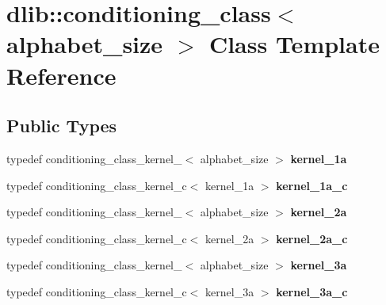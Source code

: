 \hypertarget{classdlib_1_1conditioning__class}{
\section{dlib::conditioning\_\-class$<$ alphabet\_\-size $>$ Class Template Reference}
\label{classdlib_1_1conditioning__class}
}
\subsection*{Public Types}
\begin{DoxyCompactItemize}
\item 
\hypertarget{classdlib_1_1conditioning__class_a2aa10e4625308ec0f112bc9cab1a87b4}{
typedef conditioning\_\-class\_\-kernel\_$<$ alphabet\_\-size $>$ {\bfseries kernel\_\-1a}}
\label{classdlib_1_1conditioning__class_a2aa10e4625308ec0f112bc9cab1a87b4}

\item 
\hypertarget{classdlib_1_1conditioning__class_ad77a44016d35a2d50301b8fcdb1d7e76}{
typedef conditioning\_\-class\_\-kernel\_\-c$<$ kernel\_\-1a $>$ {\bfseries kernel\_\-1a\_\-c}}
\label{classdlib_1_1conditioning__class_ad77a44016d35a2d50301b8fcdb1d7e76}

\item 
\hypertarget{classdlib_1_1conditioning__class_a41fbf8cd6b4a34869f3cbc38ce14e937}{
typedef conditioning\_\-class\_\-kernel\_$<$ alphabet\_\-size $>$ {\bfseries kernel\_\-2a}}
\label{classdlib_1_1conditioning__class_a41fbf8cd6b4a34869f3cbc38ce14e937}

\item 
\hypertarget{classdlib_1_1conditioning__class_a497e0c7e3d950b6488c3e6458270cd7f}{
typedef conditioning\_\-class\_\-kernel\_\-c$<$ kernel\_\-2a $>$ {\bfseries kernel\_\-2a\_\-c}}
\label{classdlib_1_1conditioning__class_a497e0c7e3d950b6488c3e6458270cd7f}

\item 
\hypertarget{classdlib_1_1conditioning__class_ac3ab6a7ed69f658386add2247017554f}{
typedef conditioning\_\-class\_\-kernel\_$<$ alphabet\_\-size $>$ {\bfseries kernel\_\-3a}}
\label{classdlib_1_1conditioning__class_ac3ab6a7ed69f658386add2247017554f}

\item 
\hypertarget{classdlib_1_1conditioning__class_a2b7be95af893b328128c5f11fb0870c6}{
typedef conditioning\_\-class\_\-kernel\_\-c$<$ kernel\_\-3a $>$ {\bfseries kernel\_\-3a\_\-c}}
\label{classdlib_1_1conditioning__class_a2b7be95af893b328128c5f11fb0870c6}


\end{DoxyCompactItemize}
